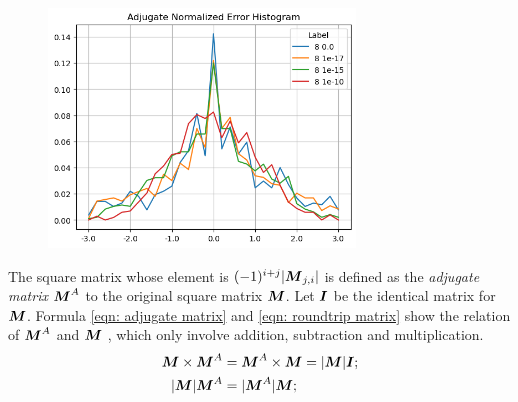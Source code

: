 \documentclass[twoside]{article}
\numberwithin{equation}{section}
\begin{document}
\begin{figure}[p]
\centering
\includegraphics[height=2.5in]{Adjugate_Histogram_Size_8.png} 
\label{fig: Adjugate_Histogram_Size_8}
\end{figure}


The square matrix whose element is $(-1)^{i+j}|\protect{\textrm{\boldmath $M$}}_{j,i}|$ is defined as the \emph{adjugate matrix} \cite{Linear_Algebra} $\protect{\textrm{\boldmath $M$}}^A$ to the original square matrix $\protect{\textrm{\boldmath $M$}}$.
Let $\protect{\textrm{\boldmath $I$}}$ be the identical matrix for $\protect{\textrm{\boldmath $M$}}$.
Formula \eqref{eqn: adjugate matrix} and \eqref{eqn: roundtrip matrix} show the relation of $\protect{\textrm{\boldmath $M$}}^A$ and $\protect{\textrm{\boldmath $M$}}$ \cite{Linear_Algebra}, which only involve addition, subtraction and multiplication.
\begin{align}
\label{eqn: adjugate matrix}
\M \times \M^A &= \M^A \times \M = |\M| \I; \\
\label{eqn: roundtrip matrix}
|\M| \M^A &=|\M^A| \M;
\end{align}
\end{document}
